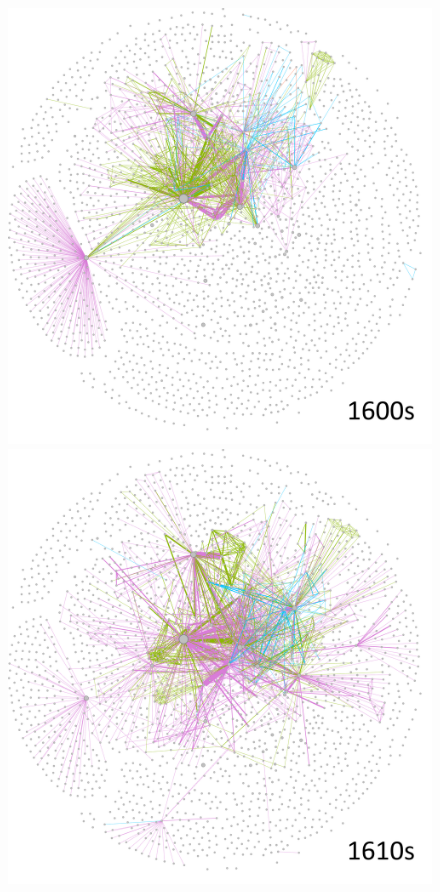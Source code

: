 \documentclass[12pt,a4paper,oneside]{book}
\begin{document}
\begin{sloppypar}
\begin{figure}[H]
\centering
\includegraphics[scale=0.4]{graph/People_1600s.png}
\includegraphics[scale=0.4]{graph/People_1610s.png}

\end{figure}
\end{sloppypar}
\end{document}
